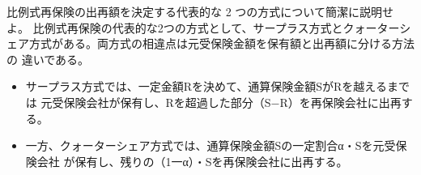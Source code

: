\documentclass[report,gutter=10mm,fore-edge=10mm,uplatex,dvipdfmx]{jlreq}
\begin{document}
比例式再保険の出再額を決定する代表的な 2 つの方式について簡潔に説明せよ。
\answer{}
比例式再保険の代表的な2つの方式として、サープラス方式とクォーターシ
ェア方式がある。両方式の相違点は元受保険金額を保有額と出再額に分ける方法の
違いである。

\begin{itemize}
\item[] サープラス方式では、一定金額Rを決めて、通算保険金額SがRを越えるまでは
 元受保険会社が保有し、Rを超過した部分（S−R）を再保険会社に出再する。
\item[] 一方、クォーターシェア方式では、通算保険金額Sの一定割合α・Sを元受保険会社
 が保有し、残りの（1一α）・Sを再保険会社に出再する。
\end{itemize}
\end{document}
